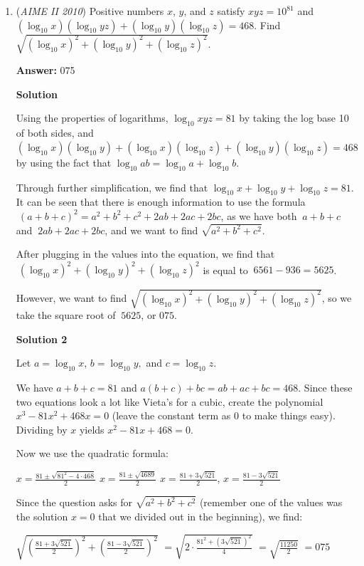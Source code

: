 \begin{enumerate}
 


	\item (\textit{AIME II 2010}) Positive numbers $x$, $y$, and $z$ satisfy $xyz = 10^{81}$ and $(\log_{10}x)(\log_{10} yz) + (\log_{10}y) (\log_{10}z) = 468$. Find $\sqrt {(\log_{10}x)^2 + (\log_{10}y)^2 + (\log_{10}z)^2}$.


 
 \textbf{Answer: }075



\textbf{Solution}

Using the properties of logarithms, $\log_{10}xyz = 81$ by taking the log base 10 of both sides, and $(\log_{10}x)(\log_{10}y) + (\log_{10}x)(\log_{10}z) + (\log_{10}y)(\log_{10}z)= 468$ by using the fact that $\log_{10}ab = \log_{10}a + \log_{10}b$. 

 Through further simplification, we find that $\log_{10}x+\log_{10}y+\log_{10}z = 81$. It can be seen that there is enough information to use the formula $\ (a+b+c)^{2} = a^{2}+b^{2}+c^{2}+2ab+2ac+2bc$, as we have both $\ a+b+c$ and $\ 2ab+2ac+2bc$, and we want to find $\sqrt {a^2 + b^2 + c^2}$. 

 After plugging in the values into the equation, we find that $\ (\log_{10}x)^2 + (\log_{10}y)^2 + (\log_{10}z)^2$ is equal to $\ 6561 - 936 = 5625$. 

 However, we want to find $\sqrt {(\log_{10}x)^2 + (\log_{10}y)^2 + (\log_{10}z)^2}$, so we take the square root of $\ 5625$, or $\boxed{075}$.

 



\textbf{Solution 2}

Let $a=\log_{10}x$, $b=\log_{10}y,$ and $c=\log_{10}z$.

 We have $a+b+c=81$ and $a(b+c)+bc=ab+ac+bc=468$. Since these two equations look a lot like Vieta's for a cubic, create the polynomial $x^3-81x^2+468x=0$ (leave the constant term as $0$ to make things easy). Dividing by $x$ yields $x^2-81x+468=0$.

 Now we use the quadratic formula:

 $x=\frac{81\pm\sqrt{81^2-4\cdot468}}{2}$
$x=\frac{81\pm\sqrt{4689}}{2}$
$x=\frac{81+3\sqrt{521}}{2}$, $x=\frac{81-3\sqrt{521}}{2}$

 Since the question asks for $\sqrt{a^2+b^2+c^2}$  (remember one of the values was the solution $x=0$ that we divided out in the beginning), we find:

 $\sqrt{\left(\frac{81+3\sqrt{521}}{2}\right)^2+\left(\frac{81-3\sqrt{521}}{2}\right)^2}$
$=\sqrt{2\cdot\frac{81^2+(3\sqrt{521})^2}{4}}$
$=\sqrt{\frac{11250}{2}}$
$=\boxed{075}$


\end{enumerate}
